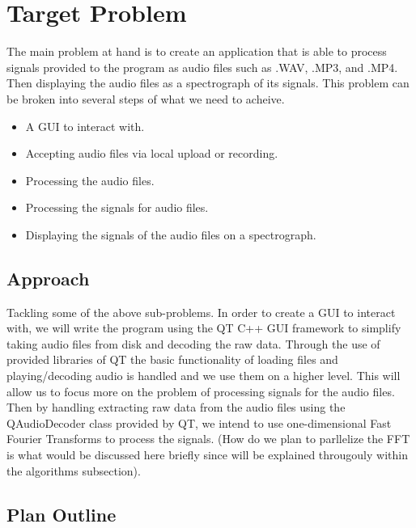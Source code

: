\documentclass[journal]{IEEEtran}
\begin{document}
\section{Target Problem}
The main problem at hand is to create an application that is able to process signals provided to the program as audio 
files such as .WAV, .MP3, and .MP4. Then displaying the audio files as a spectrograph of its signals. This problem 
can be broken into several steps of what we need to acheive.
\begin{itemize}
	\item A GUI to interact with.
	\item Accepting audio files via local upload or recording.
	\item Processing the audio files.
	\item Processing the signals for audio files.
	\item Displaying the signals of the audio files on a spectrograph.
\end{itemize}

\subsection{Approach}
Tackling some of the above sub-problems. In order to create a GUI to interact with, we will write the program using 
the QT C++ GUI framework to simplify taking audio files from disk and decoding the raw data. Through the use of provided libraries of QT 
the basic functionality of loading files and playing/decoding audio is handled and we use them on a higher level. This will 
allow us to focus more on the problem of processing signals for the audio files. Then by handling extracting 
raw data from the audio files using the QAudioDecoder class provided by QT, we intend to use one-dimensional Fast Fourier Transforms to 
process the signals. (How do we plan to parllelize the FFT is what would be discussed here briefly since will be 
explained througouly within the algorithms subsection).

\subsection{Plan Outline}
\end{document}

